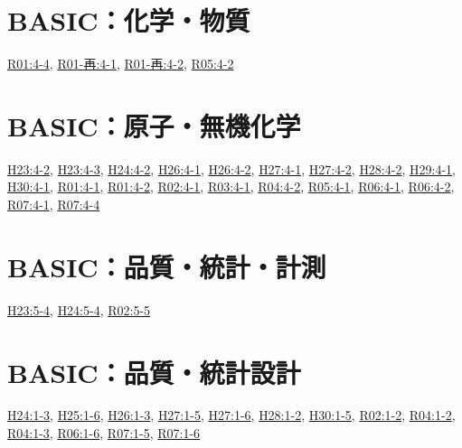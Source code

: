 \section{BASIC：化学・物質}
\hyperref[q:r01-reg-basic-4-4]{R01:4-4}, \hyperref[q:r01-ret-basic-4-1]{R01-再:4-1}, \hyperref[q:r01-ret-basic-4-2]{R01-再:4-2}, \hyperref[q:r05-reg-basic-4-2]{R05:4-2}
\section{BASIC：原子・無機化学}
\hyperref[q:h23-reg-basic-4-2]{H23:4-2}, \hyperref[q:h23-reg-basic-4-3]{H23:4-3}, \hyperref[q:h24-reg-basic-4-2]{H24:4-2}, \hyperref[q:h26-reg-basic-4-1]{H26:4-1}, \hyperref[q:h26-reg-basic-4-2]{H26:4-2}, \hyperref[q:h27-reg-basic-4-1]{H27:4-1}, \hyperref[q:h27-reg-basic-4-2]{H27:4-2}, \hyperref[q:h28-reg-basic-4-2]{H28:4-2}, \hyperref[q:h29-reg-basic-4-1]{H29:4-1}, \hyperref[q:h30-reg-basic-4-1]{H30:4-1}, \hyperref[q:r01-reg-basic-4-1]{R01:4-1}, \hyperref[q:r01-reg-basic-4-2]{R01:4-2}, \hyperref[q:r02-reg-basic-4-1]{R02:4-1}, \hyperref[q:r03-reg-basic-4-1]{R03:4-1}, \hyperref[q:r04-reg-basic-4-2]{R04:4-2}, \hyperref[q:r05-reg-basic-4-1]{R05:4-1}, \hyperref[q:r06-reg-basic-4-1]{R06:4-1}, \hyperref[q:r06-reg-basic-4-2]{R06:4-2}, \hyperref[q:r07-reg-basic-4-1]{R07:4-1}, \hyperref[q:r07-reg-basic-4-4]{R07:4-4}
\section{BASIC：品質・統計・計測}
\hyperref[q:h23-reg-basic-5-4]{H23:5-4}, \hyperref[q:h24-reg-basic-5-4]{H24:5-4}, \hyperref[q:r02-reg-basic-5-5]{R02:5-5}
\section{BASIC：品質・統計設計}
\hyperref[q:h24-reg-basic-1-3]{H24:1-3}, \hyperref[q:h25-reg-basic-1-6]{H25:1-6}, \hyperref[q:h26-reg-basic-1-3]{H26:1-3}, \hyperref[q:h27-reg-basic-1-5]{H27:1-5}, \hyperref[q:h27-reg-basic-1-6]{H27:1-6}, \hyperref[q:h28-reg-basic-1-2]{H28:1-2}, \hyperref[q:h30-reg-basic-1-5]{H30:1-5}, \hyperref[q:r02-reg-basic-1-2]{R02:1-2}, \hyperref[q:r04-reg-basic-1-2]{R04:1-2}, \hyperref[q:r04-reg-basic-1-3]{R04:1-3}, \hyperref[q:r06-reg-basic-1-6]{R06:1-6}, \hyperref[q:r07-reg-basic-1-5]{R07:1-5}, \hyperref[q:r07-reg-basic-1-6]{R07:1-6}
